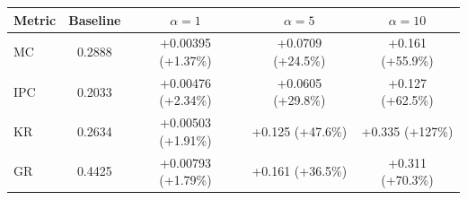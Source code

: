\begin{tabular}{lcccc}
\toprule
Metric & Baseline & $\alpha=1$ & $\alpha=5$ & $\alpha=10$ \\
\midrule
MC & 0.2888 & +0.00395 (+1.37\%) & +0.0709 (+24.5\%) & +0.161 (+55.9\%) \\
IPC & 0.2033 & +0.00476 (+2.34\%) & +0.0605 (+29.8\%) & +0.127 (+62.5\%) \\
KR & 0.2634 & +0.00503 (+1.91\%) & +0.125 (+47.6\%) & +0.335 (+127\%) \\
GR & 0.4425 & +0.00793 (+1.79\%) & +0.161 (+36.5\%) & +0.311 (+70.3\%) \\
\bottomrule
\end{tabular}

